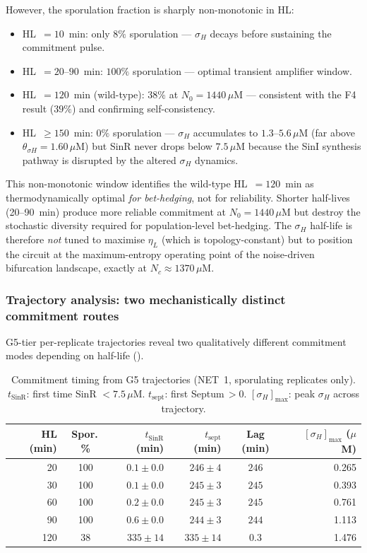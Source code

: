 \documentclass[11pt,a4paper]{article}
\begin{document}
However, the sporulation fraction is sharply non-monotonic in HL:
\begin{itemize}
\item HL~$= 10$~min: only $8\%$ sporulation --- $\sigma_H$ decays before
  sustaining the commitment pulse.
\item HL~$= 20$--$90$~min: $100\%$ sporulation --- optimal transient
  amplifier window.
\item HL~$= 120$~min (wild-type): $38\%$ at $N_0 = 1440\,\mu$M ---
  consistent with the F4 result ($39\%$) and confirming self-consistency.
\item HL~$\geq 150$~min: $0\%$ sporulation --- $\sigma_H$ accumulates
  to $1.3$--$5.6\,\mu$M (far above $\theta_{\sigma H} = 1.60\,\mu$M)
  but SinR never drops below $7.5\,\mu$M because the SinI synthesis
  pathway is disrupted by the altered $\sigma_H$ dynamics.
\end{itemize}
This non-monotonic window identifies the wild-type HL~$= 120$~min as
thermodynamically optimal \emph{for bet-hedging}, not for reliability.
Shorter half-lives (20--90~min) produce more reliable commitment at
$N_0 = 1440\,\mu$M but destroy the stochastic diversity required for
population-level bet-hedging.  The $\sigma_H$ half-life is therefore
\emph{not} tuned to maximise $\eta_L$ (which is topology-constant) but
to position the circuit at the maximum-entropy operating point of the
noise-driven bifurcation landscape, exactly at $N_c \approx 1370\,\mu$M.

\subsubsection*{Trajectory analysis: two mechanistically distinct commitment routes}

G5-tier per-replicate trajectories reveal two qualitatively different
commitment modes depending on half-life ().

\begin{table}[h]
\centering
\caption{Commitment timing from G5 trajectories (NET~1, sporulating
replicates only).  $t_{\mathrm{SinR}}$: first time SinR $< 7.5\,\mu$M.
$t_{\mathrm{sept}}$: first Septum$\,> 0$.
$[\sigma_H]_{\max}$: peak $\sigma_H$ across trajectory.}
\label{tab:t1_traj}
{\small\begin{tabular}{rcrrcr}
\toprule
HL (min) & Spor.\,\% & $t_{\mathrm{SinR}}$ (min) & $t_{\mathrm{sept}}$ (min)
  & Lag (min) & $[\sigma_H]_{\max}$ ($\mu$M) \\
\midrule
20  & 100 & $0.1 \pm 0.0$   & $246 \pm 4$   & $246$ & 0.265 \\
30  & 100 & $0.1 \pm 0.0$   & $245 \pm 3$   & $245$ & 0.393 \\
60  & 100 & $0.2 \pm 0.0$   & $245 \pm 3$   & $245$ & 0.761 \\
90  & 100 & $0.6 \pm 0.0$   & $244 \pm 3$   & $244$ & 1.113 \\
120 &  38 & $335 \pm 14$    & $335 \pm 14$  & $0.3$ & 1.476 \\
\bottomrule
\end{tabular}}
\end{table}
\end{document}
